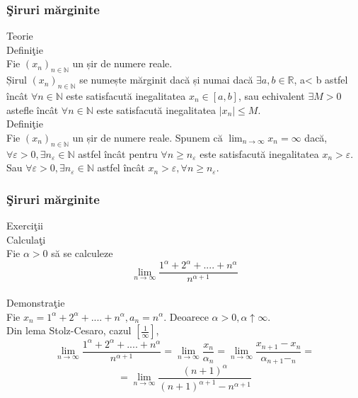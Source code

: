 \documentclass{beamer}
\theoremstyle{plain}
\begin{document}
\frame
{
\frametitle{\c Siruri m\u arginite}
Teorie 
\\ Defini\c tie 
\\ Fie \((x_{n})_{n\in \mathbb{N}}\) un șir de numere reale. 
\\ Șirul \((x_{n})_{n\in \mathbb{N}}\) se numește m\u arginit dac\u a și numai dac\u a \(\exists  a, b \in \mathbb{R}\), a< b astfel \^ inc\^ at \(\forall n\in \mathbb{N}\) este satisfacut\u a inegalitatea \(x_{n}\in \left [ a,b \right ]\), sau echivalent \(\exists M> 0\) astefle \^ inc\^ at \(\forall  n\in \mathbb{N}\) este satisfacut\u a inegalitatea \(\left | x_{n} \right |\leq M\).
\\ Defini\c tie 
\\ Fie \((x_{n})_{n\in \mathbb{N}}\) un șir de numere reale. Spunem c\u a \(\lim_{n \to \infty }x_{n}=\infty\) dac\u a, \(\forall \varepsilon > 0,\exists n_{\varepsilon }\in \mathbb{N}\) astfel \^ inc\^ at pentru \(\forall n\geq n_{\varepsilon }\) este satisfacut\u a inegalitatea \(x_{n}> \varepsilon\). 
\\Sau \(\forall \varepsilon > 0,\exists n_{\varepsilon }\in \mathbb{N}\) astfel \^ inc\^ at \(x_{n}> \varepsilon ,\forall n\geq n_{\varepsilon }\). 

}
\frame
{
\frametitle{\c Siruri m\u arginite}
Exerci\c tii
\\ Calcula\c ti
\\ Fie \(\alpha > 0\) s\u a se calculeze 
\begin{displaymath}
 \lim_{n \to \infty }\frac{1^{\alpha }+2^{\alpha }+....+n^{\alpha }}{n^{\alpha +1}}
\end{displaymath}
\\ Demonstra\c tie 
\\ Fie \(x_{n}=1^{\alpha }+2^{\alpha }+....+n^{\alpha },a_{n}= n^{\alpha }\).  Deoarece \(\alpha > 0 , \alpha \uparrow \infty\). 
\\ Din lema Stolz-Cesaro, cazul \(\left [ \frac{1}{\infty } \right ]\), 
\begin{displaymath}
 \lim_{n \to \infty }\frac{1^{\alpha }+2^{\alpha }+....+n^{\alpha }}{n^{\alpha +1}}=\lim_{n \to \infty }\frac{x_{n}}{\alpha _{n}}=\lim_{n \to \infty } \frac{x_{n+1}-x_{n}}{\alpha _{n+1}-_{n}}=
 
\end{displaymath}
\begin{displaymath}
 =\lim_{n \to \infty } \frac{\left ( n+1 \right )^{\alpha }}{\left ( n+1 \right )^{\alpha+1} -n^{\alpha +1}}
\end{displaymath}
}
\end{document}

